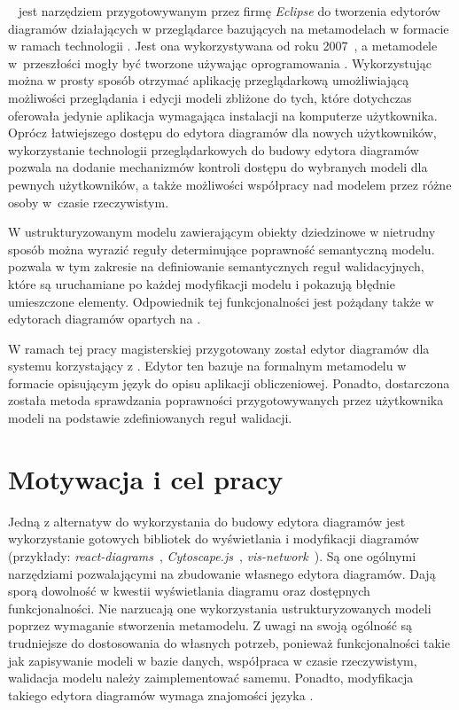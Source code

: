 \SiriusWeb{}~\cite{sirius-web-github} jest narzędziem przygotowywanym przez
firmę \emph{Eclipse} do tworzenia edytorów
diagramów działających w przeglądarce bazujących na metamodelach w formacie
\Ecore{} w ramach technologii \EMF{}.
Jest ona wykorzystywana od roku
2007~\cite{eclipse-sirius-wikipedia}, a metamodele
w~przeszłości mogły być tworzone używając oprogramowania \SiriusDesktop{}.
Wykorzystując \SiriusWeb{} można w prosty sposób otrzymać aplikację
przeglądarkową umożliwiającą możliwości przeglądania i edycji modeli zbliżone
do tych,
które dotychczas oferowała jedynie aplikacja wymagająca instalacji na
komputerze użytkownika. Oprócz łatwiejszego dostępu do edytora diagramów dla
nowych użytkowników, wykorzystanie technologii przeglądarkowych do budowy
edytora diagramów pozwala na dodanie mechanizmów kontroli dostępu do
wybranych modeli dla pewnych użytkowników, a także możliwości współpracy nad
modelem przez różne osoby w~czasie rzeczywistym.

W ustrukturyzowanym modelu zawierającym obiekty dziedzinowe w nietrudny sposób
można wyrazić reguły determinujące poprawność semantyczną modelu.
\SiriusDesktop{} pozwala w tym zakresie na definiowanie semantycznych reguł
walidacyjnych, które są uruchamiane po każdej modyfikacji modelu i pokazują
błędnie umieszczone elementy. Odpowiednik tej funkcjonalności jest pożądany
także w edytorach diagramów opartych na \SiriusWeb{}.

W ramach tej pracy magisterskiej przygotowany został edytor diagramów dla
systemu \BalticLSC{} korzystający z \SiriusWeb{}. Edytor ten bazuje na
formalnym metamodelu w formacie \Ecore{} opisującym język \CAL{} do
opisu aplikacji obliczeniowej. Ponadto, dostarczona została metoda sprawdzania
poprawności przygotowywanych przez użytkownika modeli na podstawie
zdefiniowanych reguł walidacji.

\section{Motywacja i cel pracy}

Jedną z alternatyw do wykorzystania \SiriusWeb{} do budowy edytora diagramów
jest
wykorzystanie gotowych bibliotek \JavaScript{} do wyświetlania i modyfikacji
diagramów (przykłady: \emph{react-diagrams}~\cite{react-diagrams-github},
\emph{Cytoscape.js}~\cite{cytoscape-js-homepage},
\emph{vis-network}~\cite{vis-network-github}). Są one ogólnymi narzędziami
pozwalającymi na zbudowanie własnego edytora diagramów. Dają sporą dowolność w
kwestii wyświetlania diagramu oraz
dostępnych funkcjonalności. Nie narzucają one
wykorzystania ustrukturyzowanych modeli poprzez wymaganie stworzenia
metamodelu. Z uwagi na swoją ogólność są trudniejsze do dostosowania do
własnych potrzeb, ponieważ funkcjonalności takie jak zapisywanie modeli w bazie
danych, współpraca w czasie rzeczywistym, walidacja modelu należy
zaimplementować samemu. Ponadto, modyfikacja takiego edytora diagramów wymaga
znajomości języka \JavaScript{}.

